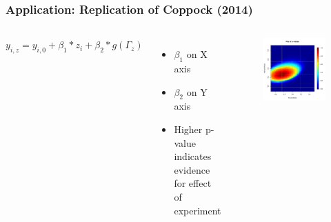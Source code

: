 \documentclass{beamer}
\begin{document}
\begin{frame}
\frametitle{Application: Replication of Coppock (2014)}
\vspace{-7mm}
\begin{columns}[c]

\begin{flushright}
\small {$y_{i,z} = y_{i,0} + \beta_1*z_i + \beta_2*g(\Gamma_z)$}
\end{flushright}
\centering
\begin{itemize}
\item \small {$\beta_1$ on X axis}
\vspace{2mm}
\item \small {$\beta_2$ on Y axis}
\vspace{2mm}
\item \small {Higher p-value indicates evidence for effect of experiment}
\end{itemize}

\begin{figure}
\centering
\includegraphics[scale=0.45]{pval_plot_coppock_replication.pdf}
\end{figure}

\end{columns}
\end{frame}
\end{document}
